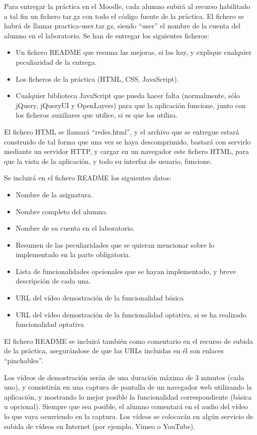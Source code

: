 Para entregar la práctica en el Moodle, cada alumno subirá al recurso habilitado a tal fin un fichero tar.gz con todo el código fuente de la práctica. El fichero se habrá de llamar practica-user.tar.gz, siendo ``user'' el nombre de la cuenta del alumno en el laboratorio. Se han de entregar los siguientes ficheros:

\begin{itemize}
\item Un fichero README que resuma las mejoras, si las hay, y explique cualquier peculiaridad de la entrega.
\item Los ficheros de la práctica (HTML, CSS, JavaScript).
\item Cualquier biblioteca JavaScript que pueda hacer falta (normalmente, sólo jQuery, jQueryUI y OpenLayers) para que la aplicación funcione, junto con los ficheros auxiliares que utilice, si es que los utiliza.
\end{itemize}

El fichero HTML se llamará ``redes.html'', y el archivo que se entregue estará construido de tal forma que una vez se haya descomprimido, bastará con servirlo mediante un servidor HTTP, y cargar en un navegador este fichero HTML, para que la vista de la aplicación, y todo su interfaz de usuario, funcione.

Se incluirá en el fichero README los siguientes datos:

\begin{itemize}
\item Nombre de la asignatura.
\item Nombre completo del alumno.
\item Nombre de su cuenta en el laboratorio.
\item Resumen de las peculiaridades que se quieran mencionar sobre lo implementado en la parte obligatoria.
\item Lista de funcionalidades opcionales que se hayan implementado, y breve descripción de cada una.
\item URL del vídeo demostración de la funcionalidad básica
\item URL del vídeo demostración de la funcionalidad optativa, si se ha realizado funcionalidad optativa
\end{itemize}

El fichero README se incluirá también como comentario en el recurso de subida de la práctica, asegurándose de que las URLs incluidas en él son enlaces ``pinchables''.

Los vídeos de demostración serán de una duración máxima de 3 minutos (cada uno), y consistirán en una captura de pantalla de un navegador web utilizando la aplicación, y mostrando lo mejor posible la funcionalidad correspondiente (básica u opcional). Siempre que sea posible, el alumno comentará en el audio del vídeo lo que vaya ocurriendo en la captura. Los vídeos se colocarán en algún servicio de subida de vídeos en Internet (por ejemplo, Vimeo o YouTube).

